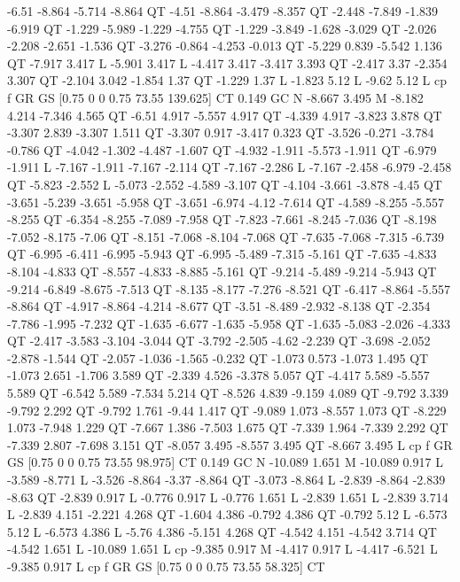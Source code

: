 -6.51 -8.864 -5.714 -8.864 QT
-4.51 -8.864 -3.479 -8.357 QT
-2.448 -7.849 -1.839 -6.919 QT
-1.229 -5.989 -1.229 -4.755 QT
-1.229 -3.849 -1.628 -3.029 QT
-2.026 -2.208 -2.651 -1.536 QT
-3.276 -0.864 -4.253 -0.013 QT
-5.229 0.839 -5.542 1.136 QT
-7.917 3.417 L
-5.901 3.417 L
-4.417 3.417 -3.417 3.393 QT
-2.417 3.37 -2.354 3.307 QT
-2.104 3.042 -1.854 1.37 QT
-1.229 1.37 L
-1.823 5.12 L
-9.62 5.12 L
cp
f
GR
GS
[0.75 0 0 0.75 73.55 139.625] CT
0.149 GC
N
-8.667 3.495 M
-8.182 4.214 -7.346 4.565 QT
-6.51 4.917 -5.557 4.917 QT
-4.339 4.917 -3.823 3.878 QT
-3.307 2.839 -3.307 1.511 QT
-3.307 0.917 -3.417 0.323 QT
-3.526 -0.271 -3.784 -0.786 QT
-4.042 -1.302 -4.487 -1.607 QT
-4.932 -1.911 -5.573 -1.911 QT
-6.979 -1.911 L
-7.167 -1.911 -7.167 -2.114 QT
-7.167 -2.286 L
-7.167 -2.458 -6.979 -2.458 QT
-5.823 -2.552 L
-5.073 -2.552 -4.589 -3.107 QT
-4.104 -3.661 -3.878 -4.45 QT
-3.651 -5.239 -3.651 -5.958 QT
-3.651 -6.974 -4.12 -7.614 QT
-4.589 -8.255 -5.557 -8.255 QT
-6.354 -8.255 -7.089 -7.958 QT
-7.823 -7.661 -8.245 -7.036 QT
-8.198 -7.052 -8.175 -7.06 QT
-8.151 -7.068 -8.104 -7.068 QT
-7.635 -7.068 -7.315 -6.739 QT
-6.995 -6.411 -6.995 -5.943 QT
-6.995 -5.489 -7.315 -5.161 QT
-7.635 -4.833 -8.104 -4.833 QT
-8.557 -4.833 -8.885 -5.161 QT
-9.214 -5.489 -9.214 -5.943 QT
-9.214 -6.849 -8.675 -7.513 QT
-8.135 -8.177 -7.276 -8.521 QT
-6.417 -8.864 -5.557 -8.864 QT
-4.917 -8.864 -4.214 -8.677 QT
-3.51 -8.489 -2.932 -8.138 QT
-2.354 -7.786 -1.995 -7.232 QT
-1.635 -6.677 -1.635 -5.958 QT
-1.635 -5.083 -2.026 -4.333 QT
-2.417 -3.583 -3.104 -3.044 QT
-3.792 -2.505 -4.62 -2.239 QT
-3.698 -2.052 -2.878 -1.544 QT
-2.057 -1.036 -1.565 -0.232 QT
-1.073 0.573 -1.073 1.495 QT
-1.073 2.651 -1.706 3.589 QT
-2.339 4.526 -3.378 5.057 QT
-4.417 5.589 -5.557 5.589 QT
-6.542 5.589 -7.534 5.214 QT
-8.526 4.839 -9.159 4.089 QT
-9.792 3.339 -9.792 2.292 QT
-9.792 1.761 -9.44 1.417 QT
-9.089 1.073 -8.557 1.073 QT
-8.229 1.073 -7.948 1.229 QT
-7.667 1.386 -7.503 1.675 QT
-7.339 1.964 -7.339 2.292 QT
-7.339 2.807 -7.698 3.151 QT
-8.057 3.495 -8.557 3.495 QT
-8.667 3.495 L
cp
f
GR
GS
[0.75 0 0 0.75 73.55 98.975] CT
0.149 GC
N
-10.089 1.651 M
-10.089 0.917 L
-3.589 -8.771 L
-3.526 -8.864 -3.37 -8.864 QT
-3.073 -8.864 L
-2.839 -8.864 -2.839 -8.63 QT
-2.839 0.917 L
-0.776 0.917 L
-0.776 1.651 L
-2.839 1.651 L
-2.839 3.714 L
-2.839 4.151 -2.221 4.268 QT
-1.604 4.386 -0.792 4.386 QT
-0.792 5.12 L
-6.573 5.12 L
-6.573 4.386 L
-5.76 4.386 -5.151 4.268 QT
-4.542 4.151 -4.542 3.714 QT
-4.542 1.651 L
-10.089 1.651 L
cp
-9.385 0.917 M
-4.417 0.917 L
-4.417 -6.521 L
-9.385 0.917 L
cp
f
GR
GS
[0.75 0 0 0.75 73.55 58.325] CT
